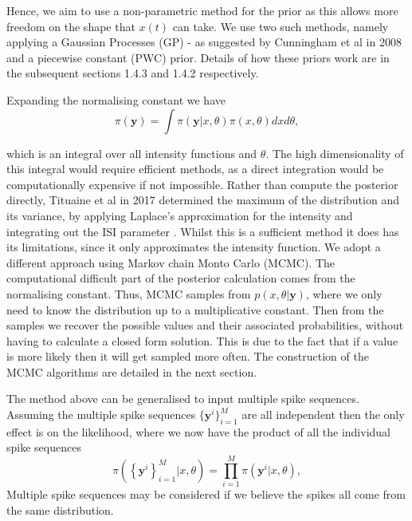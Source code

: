 \documentclass[../main.tex]{subfiles}
\begin{document}
Hence, we aim to use a non-parametric method for the prior as this allows more freedom on the shape that $x(t)$ can take. We use two such methods, namely applying a Gaussian Processes (GP) - as suggested by Cunningham et al in 2008 \cite{Cunningham2008} and a piecewise constant (PWC) prior. Details of how these priors work are in the subsequent sections 1.4.3 and 1.4.2 respectively.

Expanding the normalising constant we have
\begin{equation}
\pi(\mathbf{y}) = \int \pi(\mathbf{y} | x, \theta) \pi(x, \theta) dx d\theta,
\end{equation} 

which is an integral over all intensity functions and $\theta$. The high dimensionality of this integral would require efficient methods, as a direct integration would be computationally expensive if not impossible. Rather than compute the posterior directly, Tituaine et al  in 2017 \cite{AGNE:1} determined the maximum of the distribution and its variance, by applying Laplace's approximation for the intensity and integrating out the ISI parameter . Whilst this is a sufficient method it does has its limitations, since it only approximates the intensity function. %
 We adopt a different approach using Markov chain Monto Carlo (MCMC). The computational difficult part of the posterior calculation comes from the normalising constant. Thus, MCMC samples from $p(x,\theta | \mathbf{y})$, where we only need to know the distribution up to a multiplicative constant. Then from the samples we recover the possible values and their associated probabilities, without having to calculate a closed form solution. This is due to the fact that if a value is more likely then it will get sampled more often.  
The construction of the MCMC algorithms are detailed in the next section.

The method above can be generalised to input multiple spike sequences. Assuming the multiple spike sequences $\{\mathbf{y}^i \}^M_{i=1}$ are all independent then the only effect is on the likelihood, where we now have the product of all the individual spike sequences
\begin{equation}
\pi \left( \left\{\mathbf{y}^i \right\}^M_{i=1} | x, \theta \right) = \prod^M_{i=1} \pi \left( \mathbf{y}^i | x, \theta \right),
\end{equation} 
Multiple spike sequences may be considered if we believe the spikes all come from the same distribution.
\end{document}
